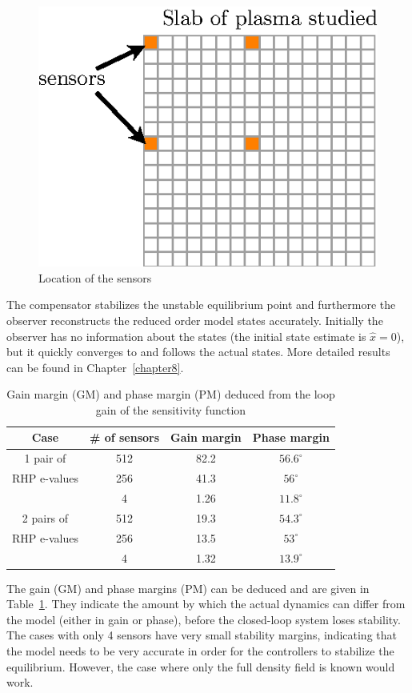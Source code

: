 \documentclass[12pt,lot, lof]{puthesis}
\begin{document}
\begin{figure}[htbp]
\centering
\includegraphics[width=0.5\linewidth]{observer4}
\caption{Location of the sensors}
\label{lqg4a}
\end{figure}

The compensator stabilizes the unstable equilibrium point and furthermore the observer reconstructs the reduced order model states accurately. Initially the observer has no information about the states (the initial state estimate is $\hat x = 0$), but it quickly converges to and follows the actual states. More detailed results can be found in Chapter~\ref{chapter8}.

\begin{table}[htbp]
	\centering
	\caption{Gain margin (GM) and phase margin (PM) deduced from the loop gain of the sensitivity function}
	\label{table4c}
	\begin{tabular}{cccc} \\[-0.5em] \hline
		Case & \# of sensors & Gain margin & Phase margin \\ \hline
		1 pair of  & 512&82.2&$56.6^\circ$   \\ 
		RHP e-values  & 256& 41.3&$56 ^\circ $\\ 
		  &4 & 1.26& $11.8^\circ$ \\ \hline
		2 pairs of  &512 &19.3 &$54.3^\circ$ \\ 
		RHP e-values  &256 & 13.5& $53^\circ$ \\ 
		  &4 & 1.32& $13.9^\circ$\\ \hline
	\end{tabular}
\end{table}

The gain (GM) and phase margins (PM) can be deduced and are given in Table~\ref{table4c}. They indicate the amount by which the actual dynamics can differ from the model (either in gain or phase), before the closed-loop system loses stability.  The cases with only 4 sensors have very small stability margins, indicating that the model needs to be very accurate in order for the controllers to stabilize the equilibrium.
However, the case where only the full density field is known would work.
\end{document}

